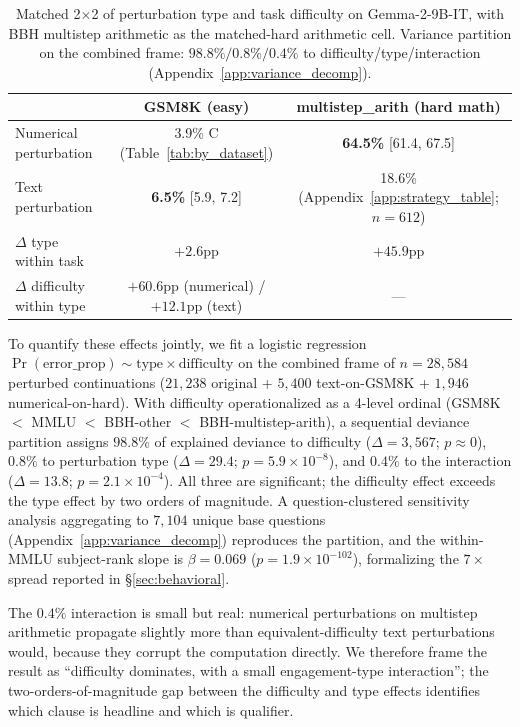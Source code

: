 \documentclass[10pt]{article} %
\begin{document}
\begin{table}[t]
\caption{Matched 2$\times$2 of perturbation type and task difficulty on Gemma-2-9B-IT, with BBH multistep arithmetic as the matched-hard arithmetic cell. Variance partition on the combined frame: $98.8\%/0.8\%/0.4\%$ to difficulty/type/interaction (Appendix~\ref{app:variance_decomp}).}
\label{tab:type_difficulty}
\begin{center}
\scriptsize
\begin{tabular}{lcc}
\toprule
 & \textbf{GSM8K (easy)} & \textbf{multistep\_arith (hard math)} \\
\midrule
Numerical perturbation & 3.9\% C {\scriptsize (Table~\ref{tab:by_dataset})} & \textbf{64.5\%} {\scriptsize [61.4, 67.5]} \\
Text perturbation      & \textbf{6.5\%} {\scriptsize [5.9, 7.2]} & 18.6\% {\scriptsize (Appendix~\ref{app:strategy_table}; $n = 612$)} \\
\midrule
$\Delta$ type within task     & $+2.6$pp & $+45.9$pp \\
$\Delta$ difficulty within type & $+60.6$pp (numerical) / $+12.1$pp (text) & --- \\
\bottomrule
\end{tabular}
\end{center}
\end{table}

To quantify these effects jointly, we fit a logistic regression $\Pr(\text{error\_prop}) \sim \text{type} \times \text{difficulty}$ on the combined frame of $n = 28{,}584$ perturbed continuations ($21{,}238$ original + $5{,}400$ text-on-GSM8K + $1{,}946$ numerical-on-hard). With difficulty operationalized as a 4-level ordinal (GSM8K $<$ MMLU $<$ BBH-other $<$ BBH-multistep-arith), a sequential deviance partition assigns $98.8\%$ of explained deviance to difficulty ($\Delta = 3{,}567$; $p \approx 0$), $0.8\%$ to perturbation type ($\Delta = 29.4$; $p = 5.9 \times 10^{-8}$), and $0.4\%$ to the interaction ($\Delta = 13.8$; $p = 2.1 \times 10^{-4}$). All three are significant; the difficulty effect exceeds the type effect by two orders of magnitude. A question-clustered sensitivity analysis aggregating to $7{,}104$ unique base questions (Appendix~\ref{app:variance_decomp}) reproduces the partition, and the within-MMLU subject-rank slope is $\beta = 0.069$ ($p = 1.9 \times 10^{-102}$), formalizing the $7\times$ spread reported in \S\ref{sec:behavioral}.

The $0.4\%$ interaction is small but real: numerical perturbations on multistep arithmetic propagate slightly more than equivalent-difficulty text perturbations would, because they corrupt the computation directly. We therefore frame the result as ``difficulty dominates, with a small engagement-type interaction''; the two-orders-of-magnitude gap between the difficulty and type effects identifies which clause is headline and which is qualifier.
\end{document}
